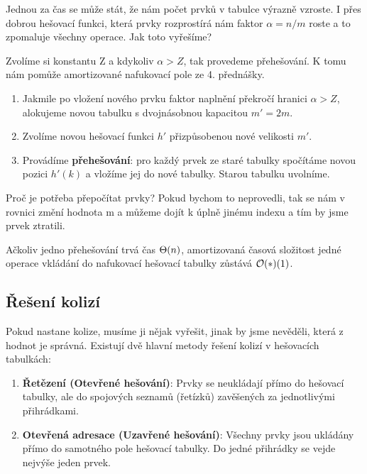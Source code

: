 Jednou za čas se může stát, že nám počet prvků v tabulce výrazně vzroste. I přes dobrou hešovací funkci, která prvky rozprostírá nám faktor $\alpha = n/m$ roste a to zpomaluje všechny operace. Jak toto vyřešíme?

\medskip

\noindent Zvolíme si konstantu Z a kdykoliv $\alpha > Z$, tak provedeme přehešování. K tomu nám pomůže amortizované nafukovací pole ze 4. přednášky.

\medskip

\begin{enumerate}
    \item Jakmile po vložení nového prvku faktor naplnění překročí hranici $\alpha > Z$, alokujeme novou tabulku s dvojnásobnou kapacitou $m' = 2m$.
    \item Zvolíme novou hešovací funkci $h'$ přizpůsobenou nové velikosti $m'$.
    \item Provádíme \textbf{přehešování}: pro každý prvek ze staré tabulky spočítáme novou pozici $h'(k)$ a vložíme jej do nové tabulky. Starou tabulku uvolníme.
\end{enumerate}

\noindent Proč je potřeba přepočítat prvky? Pokud bychom to neprovedli, tak se nám v rovnici změní hodnota m a můžeme dojít k úplně jinému indexu a tím by jsme prvek ztratili.

\medskip

\begin{theorem}
Ačkoliv jedno přehešování trvá čas $\Theta(n)$, amortizovaná časová složitost jedné operace vkládání do nafukovací hešovací tabulky zůstává $\mathcal{O}(*)(1)$.
\end{theorem}

\subsection{Řešení kolizí}

Pokud nastane kolize, musíme ji nějak vyřešit, jinak by jsme nevěděli, která z hodnot je správná. Existují dvě hlavní metody řešení kolizí v hešovacích tabulkách:

\begin{enumerate}
    \item \textbf{Řetězení (Otevřené hešování)}: Prvky se neukládají přímo do hešovací tabulky, ale do spojových seznamů (řetízků) zavěšených za jednotlivými přihrádkami.
    \item \textbf{Otevřená adresace (Uzavřené hešování)}: Všechny prvky jsou ukládány přímo do samotného pole hešovací tabulky. Do jedné přihrádky se vejde nejvýše jeden prvek.
\end{enumerate}

